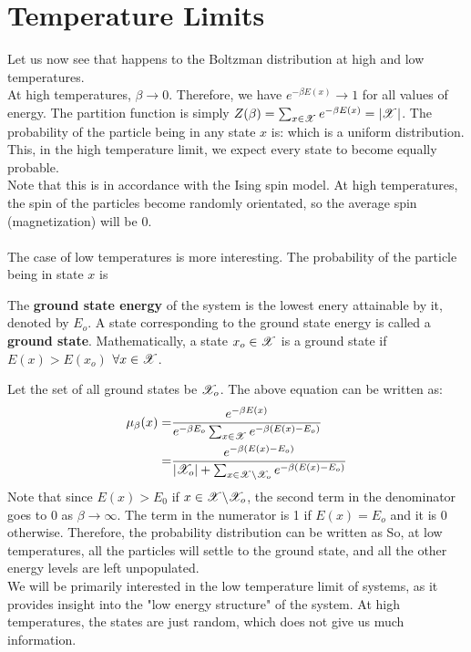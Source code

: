 \documentclass[letterpaper,english,10pt]{article}
\begin{document}
\section{Temperature Limits}
Let us now see that happens to the Boltzman distribution at high and low temperatures. \\
At high temperatures, $\beta \to 0$. Therefore, we have $e^{-\beta E(x)} \to 1$ for all values of energy. The partition function is simply $Z(\beta)=\sum_{x \in \mathscr{X}} e^{-\beta E(x)}=| \mathscr{X} |$. The probability of the particle being in any state $x$ is:
which is a uniform distribution. This, in the high temperature limit, we expect every state to become equally probable.\\
Note that this is in accordance with the Ising spin model. At high temperatures, the spin of the particles become randomly orientated, so the average spin (magnetization) will be 0. \\\\
The case of low temperatures is more interesting. The probability of the particle being in state $x$ is 
\begin{defn}
The \textbf{ground state energy} of the system is the lowest enery attainable by it, denoted by $E_o$. A state corresponding to the ground state energy is called a \textbf{ground state}. Mathematically, a state $x_o \in \mathscr{X}$ is a ground state if $E(x)>E(x_o)$  $\forall x \in \mathscr{X}$. 
\end{defn}
 Let the set of all ground states be $\mathscr{X}_o$. The above equation can be written as:
\begin{align*}
\mu_{\beta} (x)=&\frac{e^{-\beta E(x)}}{e^{-\beta E_o} \sum_{x \in \mathscr{X}} e^{-\beta \left(E(x)-E_o\right)}} \\
=&\frac{e^{-\beta (E(x)-E_o)}}{|\mathscr{X}_o|+\sum_{x \in \mathscr{X} \backslash \mathscr{X}_o} e^{-\beta (E(x)-E_o)}}
\end{align*}
Note that since $E(x)>E_0$ if $x \in \mathscr{X} \backslash \mathscr{X}_o$, the second term in the denominator goes to 0 as $\beta \to \infty$. The term in the numerator is 1 if $E(x)=E_o$ and it is 0 otherwise. Therefore, the probability distribution can be written as 
So, at low temperatures, all the particles will settle to the ground state, and all the other energy levels are left unpopulated.\\
We will be primarily interested in the low temperature limit of systems, as it provides insight into the "low energy structure" of the system. At high temperatures, the states are just random, which does not give us much information.  
\end{document}
